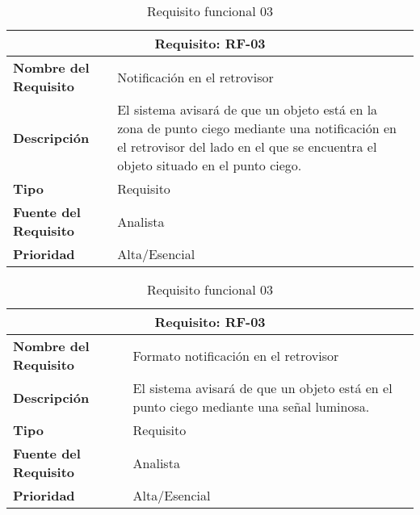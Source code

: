 \begin{table}[H]
\begin{center}
\begin{tabular}{p{} p{7cm}}
\multicolumn{2}{c}{\textbf{Requisito: RF-03} } \\
\hline \hline
\textbf{Nombre del Requisito} & Notificación en el retrovisor \\
\hline
\textbf{Descripción} & El sistema avisará de que un objeto está en la zona de punto ciego mediante una notificación en el retrovisor del lado en el que se encuentra el objeto situado en el punto ciego.\\
\hline
\textbf{Tipo} & Requisito  \\
\hline
\textbf{Fuente del Requisito} & Analista  \\
\hline
\textbf{Prioridad} & Alta/Esencial  \\ \hline
\end{tabular}
\caption{Requisito funcional 03}
\label{tab:personal}
\end{center}
\end{table}

\begin{table}[H]
\begin{center}
\begin{tabular}{p{} p{7cm}}
\multicolumn{2}{c}{\textbf{Requisito: RF-03} } \\
\hline \hline
\textbf{Nombre del Requisito} & Formato notificación en el retrovisor \\
\hline
\textbf{Descripción} & El sistema avisará de que un objeto está en el punto ciego mediante una señal luminosa.\\
\hline
\textbf{Tipo} & Requisito  \\
\hline
\textbf{Fuente del Requisito} & Analista  \\
\hline
\textbf{Prioridad} & Alta/Esencial  \\ \hline
\end{tabular}
\caption{Requisito funcional 03}
\label{tab:personal}
\end{center}
\end{table}

